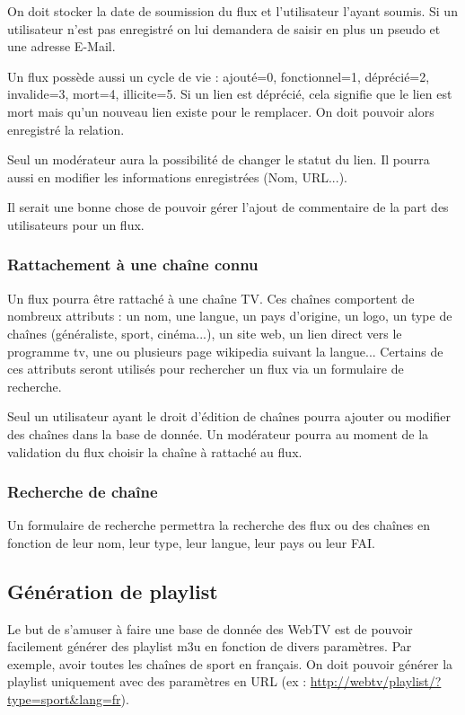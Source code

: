 \documentclass[10pt,a4paper]{article}
\begin{document}
On doit stocker la date de soumission du flux et l'utilisateur l'ayant soumis. Si un utilisateur n'est pas enregistré on lui demandera de saisir en plus un pseudo et une adresse E-Mail.

Un flux possède aussi un cycle de vie : ajouté=0, fonctionnel=1, déprécié=2, invalide=3, mort=4, illicite=5. Si un lien est déprécié, cela signifie que le lien est mort mais qu'un nouveau lien existe pour le remplacer. On doit pouvoir alors enregistré la relation.

Seul un modérateur aura la possibilité de changer le statut du lien. Il pourra aussi en modifier les informations enregistrées (Nom, URL...).

Il serait une bonne chose de pouvoir gérer l'ajout de commentaire de la part des utilisateurs pour un flux.

\subsubsection{Rattachement à une chaîne connu}

Un flux pourra être rattaché à une chaîne TV. Ces chaînes comportent de nombreux attributs : un nom, une langue, un pays d'origine, un logo, un type de chaînes (généraliste, sport, cinéma...), un site web, un lien direct vers le programme tv, une ou plusieurs page wikipedia suivant la langue... Certains de ces attributs seront utilisés pour rechercher un flux via un formulaire de recherche.

Seul un utilisateur ayant le droit d'édition de chaînes pourra ajouter ou modifier des chaînes dans la base de donnée. Un modérateur pourra au moment de la validation du flux choisir la chaîne à rattaché au flux.

\subsubsection{Recherche de chaîne}

Un formulaire de recherche permettra la recherche des flux ou des chaînes en fonction de leur nom, leur type, leur langue, leur pays ou leur FAI.

\subsection{Génération de playlist}

Le but de s'amuser à faire une base de donnée des WebTV est de pouvoir facilement générer des playlist m3u en fonction de divers paramètres. Par exemple, avoir toutes les chaînes de sport en français. On doit pouvoir générer la playlist uniquement avec des paramètres en URL (ex : \url{http://webtv/playlist/?type=sport&lang=fr}).
\end{document}
